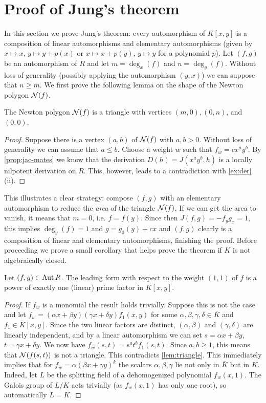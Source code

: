\documentclass[a4paper,10pt]{amsart}
\begin{document}
\section{Proof of Jung's theorem}\label{sec:3}
In this section we prove Jung's theorem: every automorphism of \(K[x,y]\) is a composition of linear automorphisms and elementary automorphisms
(given by \(x\mapsto x\), \(y\mapsto y+p(x)\) or \(x\mapsto x+p(y)\), \(y\mapsto y\) for a polynomial \(p\)).
Let \((f,g)\) be an automorphism of \(R\) and let \(m=\deg_x(f)\) and \(n=\deg_y(f)\). Without loss of generality (possibly applying the automorphism \((y,x)\)) we can suppose that \(n\ge m\).
We first prove the following lemma on the shape of the Newton polygon \(\mathcal{N}(f)\).
\begin{lemma}\label{lem:triangle}
  The Newton polygon \(\mathcal{N}(f)\) is a triangle with vertices \((m,0),(0,n)\), and \((0,0)\).
\end{lemma}
\begin{proof}
  Suppose there is a vertex \((a,b)\) of \(\mathcal{N}(f)\) with \(a,b>0\). Without loss of generality we can assume that \(a\le b\). Choose a weight \(w\) such that \(f_w=cx^ay^b\).
  By \cref{prop:jac-mates} we know that the derivation
  \(D(h)=J(x^ay^b,h)\) is a locally nilpotent derivation on \(R\). This, however, leads to a contradiction with \cref{ex:der} (ii).
\end{proof}
This illustrates a clear strategy: compose \((f,g)\) with an elementary automorphism to reduce the \emph{area} of the triangle \(\mathcal{N}(f)\).
If we can get the area to vanish, it means that
\(m=0\), i.e. \(f=f(y)\). Since then \(J(f,g)=-f_yg_x=1\), this implies \(\deg_y(f)=1\) and \(g=g_0(y)+cx\) and \((f,g)\) clearly is a composition of linear and elementary automorphisms,
finishing the proof. Before proceeding we prove a small corollary that helps prove the theorem if \(K\) is not algebraically closed.
\begin{corollary}\label{cor:non-acf}
  Let \((f,g)\in \operatorname{Aut} R\).
  The leading form with respect to the weight \((1,1)\) of \(f\) is a power of exactly one (linear) prime factor in \(K[x,y]\).
\end{corollary}
\begin{proof}
  If \(f_w\) is a monomial the result holds trivially.
  Suppose this is not the case and let \(f_w=(\alpha x+\beta y)(\gamma x+\delta y)f_1(x,y)\)
  for some \(\alpha,\beta,\gamma,\delta\in \bar{K}\) and \(f_1\in \bar{K}[x,y]\).
  Since the two linear factors are distinct, \((\alpha,\beta)\) and \((\gamma,\delta)\) are linearly independent,
  and by a linear automorphism we can set \(s=\alpha x+\beta y\), \(t=\gamma x +\delta y\).
  We now have \(f_w(s,t)=s^at^bf_1(s,t)\). Since \(a,b\ge 1\), this means that \(\mathcal{N}(f(s,t))\) is not a triangle. This contradicts \cref{lem:triangle}.
  This immediately implies that for \(f_w=\alpha(\beta x+\gamma y)^k\) the scalars \(\alpha,\beta,\gamma\) lie not only in \(\bar{K}\) but in \(K\). Indeed, let \(L\) be the splitting field
  of a dehomogenized polynomial \(f_w(x,1)\). The Galois group of \(L/K\) acts trivially (as \(f_w(x,1)\) has only one root), so automatically \(L=K\).
\end{proof}
\end{document}

